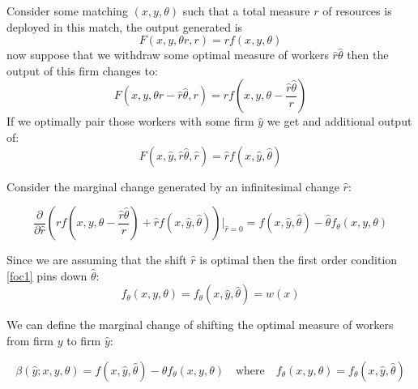 \documentclass[12pt]{article}
\theoremstyle{definition}
\begin{document}
 Consider some matching $(x,y,\theta)$ such that a total measure $r$ of resources is deployed in this match, the output generated is $$F(x,y,\theta r, r) = r f(x,y,\theta)$$ now suppose that we withdraw some optimal measure of workers $\hat{r}\hat{\theta}$ then the output of this firm changes to: $$F(x,y,\theta r - \hat{r}\hat{\theta}, r) = r f\left(x,y,\theta - \frac{ \hat{r}\hat{\theta} }{r}\right)$$
If we optimally pair those workers with some firm $\hat{y}$ we get and additional output of:$$F(x,\hat{y}, \hat{r}\hat{\theta}, \hat{r}) =  \hat{r} f(x,\hat{y}, \hat{\theta})$$

Consider the marginal change generated by an infinitesimal change $\hat{r}$:

$$\frac{\partial}{\partial \hat{r}}\left(r f\left(x,y,\theta - \frac{ \hat{r}\hat{\theta} }{r}\right) + \hat{r} f(x,\hat{y}, \hat{\theta})\right)\Big\vert_{\hat{r} = 0 } = f(x,\hat{y}, \hat{\theta}) - \hat{\theta}f_\theta(x,y,\theta)$$ 

Since we are assuming that the shift $\hat{r}$ is optimal then the first order condition \eqref{foc1} pins down $\hat{\theta}$:$$f_\theta(x,y,\theta)=f_\theta(x,\hat{y},\hat{\theta}) = w(x)$$

We can define the marginal change of shifting the optimal measure of workers from firm $y$ to firm $\hat{y}$:

\begin{equation}\label{beta_defin}
\beta(\hat{y};x,y,\theta) = f(x,\hat{y}, \hat{\theta}) - \hat{\theta}f_\theta(x,y,\theta) \quad \text{where} \quad f_\theta(x,y,\theta)=f_\theta(x,\hat{y},\hat{\theta})
\end{equation}
\end{document}
